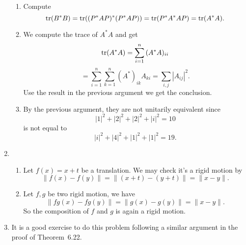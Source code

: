 \begin{enumerate}
\begin{enumerate}
\item Compute 
\[\operatorname{tr}(B^*B)=\operatorname{tr}((P^*AP)^*(P^*AP))=\operatorname{tr}(P^*A^*AP)=\operatorname{tr}(A^*A).\]
\item We compute the trace of $A^*A$ and get 
\[\operatorname{tr}(A^*A)=\sum_{i=1}^n{(A^*A)_{ii}}\]
\[=\sum_{i=1}^n{\sum_{k=1}^n{(A^*)_{ik}A_{ki}}}=\sum_{i,j}{|A_{ij}|^2}.\]
Use the result in the previous argument we get the conclusion.
\item By the previous argument, they are not unitarily equivalent since 
\[|1|^2+|2|^2+|2|^2+|i|^2=10\]
is not equal to 
\[|i|^2+|4|^2+|1|^2+|1|^2=19.\]
\end{enumerate}
\item \begin{enumerate}
\item Let $f(x)=x+t$ be a translation. We may check it's a rigid motion by 
\[\|f(x)-f(y)\|=\|(x+t)-(y+t)\|=\|x-y\|.\]
\item Let $f,g$ be two rigid motion, we have 
\[\|fg(x)-fg(y)\|=\|g(x)-g(y)\|=\|x-y\|.\]
So the composition of $f$ and $g$ is again a rigid motion.
\end{enumerate}
\item It is a good exercise to do this problem following a similar argument in the proof of Theorem~6.22.  


\end{enumerate}
